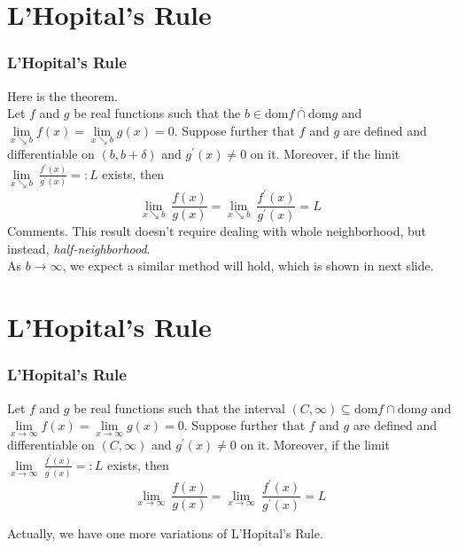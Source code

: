 \documentclass[12pt, t]{beamer}
\renewcommand{\emph}[1]{{\color{Turquoise3}\textsl{#1}}}
\begin{document}
\section{L'Hopital's Rule}
\begin{frame}
    \frametitle{L'Hopital's Rule}
    Here is the theorem.\\
    \hspace{1em}
    Let $f$ and $g$ be real functions such that the $b\in\overline{\mathrm{dom}f\cap \mathrm{dom}g}$ and
    $\underset{x\searrow b}{\lim}f(x)=\underset{x\searrow b}{\lim}g(x)=0$. Suppose further that $f$ and $g$ are defined and differentiable on
    $(b,b+\delta)$ and $g^\prime  (x)\neq 0$ on it. Moreover, if the limit $\underset{x\searrow b}{\lim}\ \frac{f^\prime  (x)}{g^\prime (x)}=:L$ exists, then
    \begin{equation*}
        \underset{x\searrow b}{\lim}\ \frac{f(x)}{g(x)}=\underset{x\searrow b}{\lim}\ \frac{f^\prime (x)}{g^\prime (x)}=L
    \end{equation*}
    Comments. This result doesn't require dealing with whole neighborhood, but instead, \emph{half-neighborhood}.\\
    \vspace{0.5em}
    \hspace{1em}
    As $b\rightarrow \infty$, we expect a similar method will hold, which is shown in next slide.
\end{frame}

\section{L'Hopital's Rule}
\begin{frame}
    \frametitle{L'Hopital's Rule}
    Let $f$ and $g$ be real functions such that the interval $(C,\infty)\subseteq \mathrm{dom}f\cap \mathrm{dom}g$ and
    $\underset{x\rightarrow \infty }{\lim}f(x)=\underset{x\rightarrow \infty }{\lim}g(x)=0$. Suppose further that $f$ and $g$ are defined
    and differentiable on $(C,\infty)$ and $g^\prime (x)\neq 0$ on it. Moreover, if the limit $\underset{x\rightarrow \infty }{\lim}\ \frac{f^\prime (x)}{g^\prime (x)}=:L$ exists, then
    \begin{equation*}
        \underset{x\rightarrow\infty}{\lim}\ \frac{f(x)}{g(x)}=\underset{x\rightarrow\infty}{\lim}\ \frac{f^\prime (x)}{g^\prime (x)}=L
    \end{equation*}

    \vspace{0.5em}
    \hspace{1em}
    Actually, we have one more variations of L'Hopital's Rule.
\end{frame}
\end{document}
